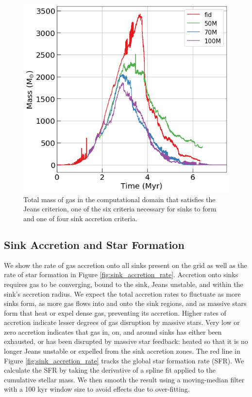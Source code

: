 \documentclass[twoside]{drexel-thesis}
\begin{document}
\begin{thesis}
\begin{figure}
	\includegraphics[width=\columnwidth]{jeans_gas_fixed.png}
    \caption{Total mass of gas in the computational domain that satisfies the Jeans criterion, one of the six criteria necessary for sinks to form and one of four sink accretion criteria.}
    \label{fig:jeans_gas}
\end{figure}

\subsection{Sink Accretion and Star Formation}
We show the rate of gas accretion onto all sinks present on the grid as well as the rate of star formation in Figure \ref{fig:sink_accretion_rate}. Accretion onto sinks requires gas to be converging, bound to the sink, Jeans unstable, and within the sink's accretion radius. We expect the total accretion rates to fluctuate as more sinks form, as more gas flows into and onto the sink regions, and as massive stars form that heat or expel dense gas, preventing its accretion. Higher rates of accretion indicate lesser degrees of gas disruption by massive stars. Very low or zero accretion indicates that gas in, on, and around sinks has either been exhausted, or has been disrupted by massive star feedback: heated so that it is no longer Jeans unstable or expelled from the sink accretion zones. The red line in Figure \ref{fig:sink_accretion_rate} tracks the global star formation rate (SFR). We calculate the SFR by taking the derivative of a spline fit applied to the cumulative stellar mass. We then smooth the result using a moving-median filter with a 100 kyr window size to avoid effects due to over-fitting.


\end{thesis}
\end{document}
